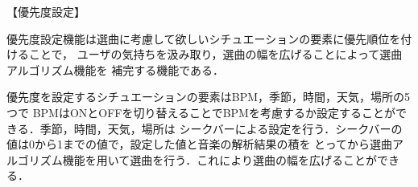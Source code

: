 【優先度設定】
\par
 優先度設定機能は選曲に考慮して欲しいシチュエーションの要素に優先順位を付けることで，
 ユーザの気持ちを汲み取り，選曲の幅を広げることによって選曲アルゴリズム機能を
 補完する機能である．
 
\par 
 優先度を設定するシチュエーションの要素はBPM，季節，時間，天気，場所の5つで
 BPMはONとOFFを切り替えることでBPMを考慮するか設定することができる．季節，時間，天気，場所は
 シークバーによる設定を行う．シークバーの値は0から1までの値で，設定した値と音楽の解析結果の積を
 とってから選曲アルゴリズム機能を用いて選曲を行う．これにより選曲の幅を広げることができる．
 
